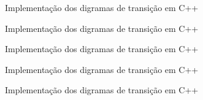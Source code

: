 \begin{frame}[fragile]{Implementação dos digramas de transição em C++}
\end{frame}

\begin{frame}[fragile]{Implementação dos digramas de transição em C++}
\end{frame}

\begin{frame}[fragile]{Implementação dos digramas de transição em C++}
\end{frame}

\begin{frame}[fragile]{Implementação dos digramas de transição em C++}
\end{frame}

\begin{frame}[fragile]{Implementação dos digramas de transição em C++}
\end{frame}
